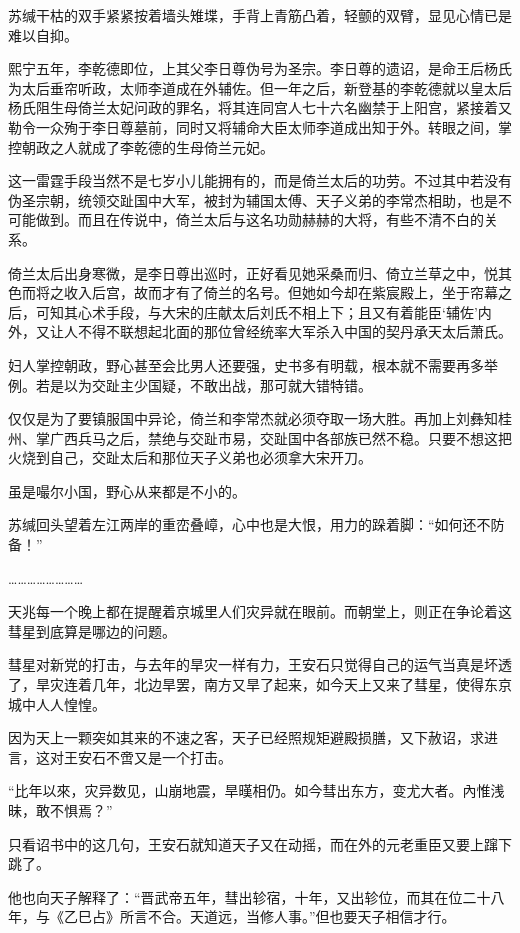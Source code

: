苏缄干枯的双手紧紧按着墙头雉堞，手背上青筋凸着，轻颤的双臂，显见心情已是难以自抑。

熙宁五年，李乾德即位，上其父李日尊伪号为圣宗。李日尊的遗诏，是命王后杨氏为太后垂帘听政，太师李道成在外辅佐。但一年之后，新登基的李乾德就以皇太后杨氏阻生母倚兰太妃问政的罪名，将其连同宫人七十六名幽禁于上阳宫，紧接着又勒令一众殉于李日尊墓前，同时又将辅命大臣太师李道成出知于外。转眼之间，掌控朝政之人就成了李乾德的生母倚兰元妃。

这一雷霆手段当然不是七岁小儿能拥有的，而是倚兰太后的功劳。不过其中若没有伪圣宗朝，统领交趾国中大军，被封为辅国太傅、天子义弟的李常杰相助，也是不可能做到。而且在传说中，倚兰太后与这名功勋赫赫的大将，有些不清不白的关系。

倚兰太后出身寒微，是李日尊出巡时，正好看见她采桑而归、倚立兰草之中，悦其色而将之收入后宫，故而才有了倚兰的名号。但她如今却在紫宸殿上，坐于帘幕之后，可知其心术手段，与大宋的庄献太后刘氏不相上下；且又有着能臣‘辅佐’内外，又让人不得不联想起北面的那位曾经统率大军杀入中国的契丹承天太后萧氏。

妇人掌控朝政，野心甚至会比男人还要强，史书多有明载，根本就不需要再多举例。若是以为交趾主少国疑，不敢出战，那可就大错特错。

仅仅是为了要镇服国中异论，倚兰和李常杰就必须夺取一场大胜。再加上刘彝知桂州、掌广西兵马之后，禁绝与交趾市易，交趾国中各部族已然不稳。只要不想这把火烧到自己，交趾太后和那位天子义弟也必须拿大宋开刀。

虽是嘬尔小国，野心从来都是不小的。

苏缄回头望着左江两岸的重峦叠嶂，心中也是大恨，用力的跺着脚：“如何还不防备！”

……………………

天兆每一个晚上都在提醒着京城里人们灾异就在眼前。而朝堂上，则正在争论着这彗星到底算是哪边的问题。

彗星对新党的打击，与去年的旱灾一样有力，王安石只觉得自己的运气当真是坏透了，旱灾连着几年，北边旱罢，南方又旱了起来，如今天上又来了彗星，使得东京城中人人惶惶。

因为天上一颗突如其来的不速之客，天子已经照规矩避殿损膳，又下赦诏，求进言，这对王安石不啻又是一个打击。

“比年以來，灾异数见，山崩地震，旱暵相仍。如今彗出东方，变尤大者。內惟浅昧，敢不惧焉？”

只看诏书中的这几句，王安石就知道天子又在动摇，而在外的元老重臣又要上蹿下跳了。

他也向天子解释了：“晋武帝五年，彗出轸宿，十年，又出轸位，而其在位二十八年，与《乙巳占》所言不合。天道远，当修人事。”但也要天子相信才行。

